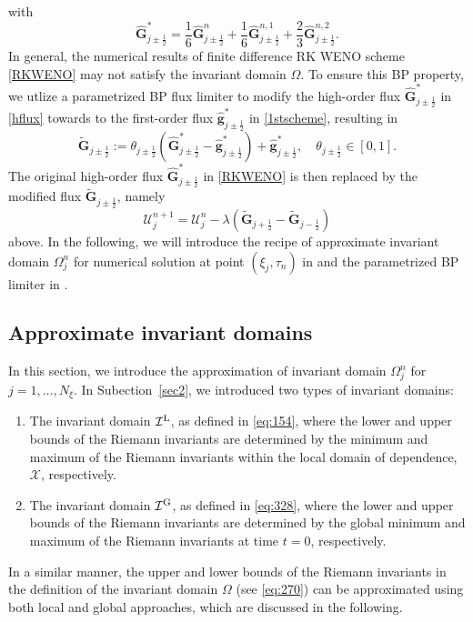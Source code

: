 \documentclass[times,final,11pt]{elsarticle}
\numberwithin{equation}{section}
\theoremstyle{definition}
\theoremstyle{remark}
\begin{document}
with 
\begin{equation}
\label{hflux}
	\widehat{\mathbf{G}}_{j \pm \frac{1}{2}}^* =\frac{1}{6} \widehat{\mathbf{G}}_{j \pm \frac{1}{2}}^{n} + \frac{1}{6}\widehat{\mathbf{G}}_{j \pm \frac{1}{2}}^{n,1} + \frac{2}{3}\widehat{\mathbf{G}}_{j \pm \frac{1}{2}}^{n,2}.
\end{equation} 
In general, the numerical results of finite difference RK WENO scheme \eqref{RKWENO} may not satisfy the invariant domain $\Omega$. 
To ensure this BP property, we utlize a parametrized BP flux limiter to modify the high-order flux $\widehat{\mathbf{G}}_{j \pm \frac{1}{2}}^*$ in \eqref{hflux} towards to the first-order flux $\widehat{\mathbf{g}}_{j \pm \frac{1}{2}}^*$ in \eqref{1stscheme}, resulting in
\begin{equation}
\label{G}
    \widetilde{\mathbf{G}}_{j \pm \frac{1}{2}} := \theta_{j \pm \frac{1}{2}} \left(\widehat{\mathbf{G}}_{j \pm \frac{1}{2}}^* - \widehat{\mathbf{g}}_{j \pm \frac{1}{2}}^*\right) + \widehat{\mathbf{g}}_{j \pm \frac{1}{2}}^*, \quad \theta_{j \pm \frac{1}{2}} \in [0, 1].
\end{equation}
The original high-order flux $\widehat{\mathbf{G}}_{j \pm \frac{1}{2}}^*$ in \eqref{RKWENO} is then replaced by the modified flux $\widetilde{\mathbf{G}}_{j \pm \frac{1}{2}}$, namely
\begin{equation}
\label{fl}
    \boldsymbol{\mathcal{U}}_j^{n + 1} = \boldsymbol{\mathcal{U}}_j^{n} - \lambda \left(\widetilde{\mathbf{G}}_{j + \frac{1}{2}} - \widetilde{\mathbf{G}}_{j - \frac{1}{2}}\right)
\end{equation} above.
In the following, we will introduce the recipe of approximate invariant domain ${\Omega}_j^{n}$ for numerical solution at point $(\xi_j, \tau_n)$ in  and the parametrized BP limiter in .


\subsection{Approximate invariant domains}\label{sec:1596}

In this section, we introduce the approximation of invariant domain $\Omega^{n}_j$ for $j = 1,\dots,N_\xi$.
In Subection~\ref{sec2}, we introduced two types of invariant domains:
\begin{enumerate}[leftmargin=8mm]
	\item[(I)] The invariant domain $\mathcal{I}^{\rm L}$, as defined in \eqref{eq:154}, where the lower and upper bounds of the Riemann invariants are determined by the minimum and maximum of the Riemann invariants within the local domain of dependence, $\mathcal{X}$, respectively.
	\item[(II)] The invariant domain $\mathcal{I}^{\rm G}$, as defined in \eqref{eq:328}, where the lower and upper bounds of the Riemann invariants are determined by the global minimum and maximum of the Riemann invariants at time $t = 0$, respectively.
\end{enumerate}
In a similar manner, the upper and lower bounds of the Riemann invariants in the definition of the invariant domain $\Omega$ (see \eqref{eq:270}) can be approximated using both local and global approaches, which are discussed in the following.
\end{document}
